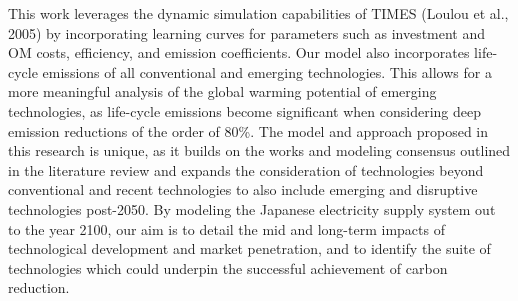 This work leverages the dynamic simulation capabilities of TIMES (Loulou et al., 2005) by incorporating learning curves for parameters such as investment and \gls{OM} costs, efficiency, and emission coefficients. Our model also incorporates life-cycle emissions of all conventional and emerging technologies. This allows for a more meaningful analysis of the global warming potential of emerging technologies, as life-cycle emissions become significant when considering deep emission reductions of the order of 80\%. The model and approach proposed in this research is unique, as it builds on the works and modeling consensus outlined in the literature review and expands the consideration of technologies beyond conventional and recent technologies to also include emerging and disruptive technologies post-2050. By modeling the Japanese electricity supply system out to the year 2100, our aim is to detail the mid and long-term impacts of technological development and market penetration, and to identify the suite of technologies which could underpin the successful achievement of carbon reduction.
